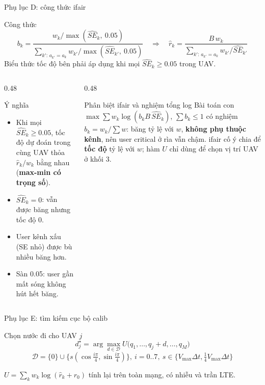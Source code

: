 \documentclass[aspectratio=169,10pt,t]{beamer}
\newcommand{\hl}[1]{\textcolor{MainBlue}{\textbf{#1}}}
\newcommand{\SE}{\widehat{SE}}
\begin{document}
\begin{frame}{Phụ lục D: công thức ifair}
\begin{block}{Công thức}
\vspace{-4mm}
\[
b_k = \frac{w_k / \max(\SE_k,\ 0.05)}{\displaystyle\sum_{k':\,a_{k'}=a_k} w_{k'} / \max(\SE_{k'},\ 0.05)}
\quad\Longrightarrow\quad
\hat r_k = \frac{B\,w_k}{\displaystyle\sum_{k':\,a_{k'}=a_k} w_{k'}/\SE_{k'}}
\]
\scriptsize Biểu thức tốc độ bên phải áp dụng khi mọi $\SE_k \ge 0.05$ trong UAV.
\end{block}
\begin{columns}[T,onlytextwidth]
\begin{column}{0.48\textwidth}
\vspace{0pt}
  \begin{block}{Ý nghĩa}
    \small
    \begin{itemize}
      \item Khi mọi $\SE_k \ge 0.05$, tốc độ dự đoán trong cùng UAV thỏa $\hat r_k/w_k$ bằng nhau (\hl{max-min có trọng số}).
      \item $\SE_k = 0$: vẫn được băng nhưng tốc độ 0.
      \item User kênh xấu (SE nhỏ) được bù nhiều băng hơn.
      \item Sàn 0.05: user gần mất sóng không hút hết băng.
    \end{itemize}
  \end{block}
\end{column}
\begin{column}{0.48\textwidth}
\vspace{0pt}
  \begin{block}{Phân biệt ifair và nghiệm tổng log}
    \small
    Bài toán con $\max\sum w_k\log(b_k B\,\SE_k)$, $\sum b_k\le1$ có nghiệm $b_k = w_k/\sum w$: băng tỷ lệ với $w$,
    \textbf{không phụ thuộc kênh}, nên user critical ở rìa vẫn chậm.
    ifair cố ý chia để \hl{tốc độ} tỷ lệ với $w$; hàm $U$ chỉ dùng để chọn vị trí UAV ở khối 3.
  \end{block}
\end{column}
\end{columns}
\end{frame}

\begin{frame}{Phụ lục E: tìm kiếm cục bộ calib}
\begin{block}{Chọn nước đi cho UAV $j$}
    \[
      d^\star_j = \arg\max_{d\in\mathcal{D}} U\big(q_1,\dots,q_j+d,\dots,q_M\big)
    \]
    \[
      \mathcal{D} = \{0\}\cup\{s(\cos\tfrac{i\pi}{4},\sin\tfrac{i\pi}{4})\},\ i=0..7,\ s\in\{V_{\max}\Delta t,\tfrac14V_{\max}\Delta t\}
    \]
\end{block}
\small $U = \sum_k w_k\log(\hat r_k + r_0)$ tính lại trên toàn mạng, có nhiễu và trần LTE.
\end{frame}
\end{document}
